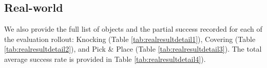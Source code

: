 \documentclass{article} %
\begin{document}
\subsection{Real-world}
\label{appen:real_results}


We also provide the full list of objects and the partial success recorded for each of the evaluation rollout: Knocking (Table \ref{tab:realresultdetail1}), Covering (Table \ref{tab:realresultdetail2}), and Pick \& Place (Table \ref{tab:realresultdetail3}). The total average success rate is provided in Table \ref{tab:realresultdetail4}).
\end{document}

